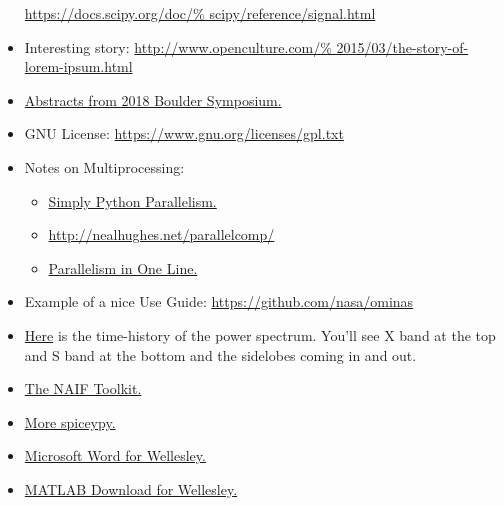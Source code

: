 \documentclass[crop=false,class=article,oneside]{standalone}
\begin{document}
\begin{itemize}[itemsep=0pt]
                      \url{https://docs.scipy.org/doc/%
                           scipy/reference/signal.html}
                \item Interesting story:
                      \url{http://www.openculture.com/%
                           2015/03/the-story-of-lorem-ipsum.html}
                \item \href{http://lasp.colorado.edu/media/%
                            projects/cassini/docs/%
                            Cassini_Science_Symposium_2018_%
                            Program-LowResForWeb.pdf}
                           {Abstracts from 2018 Boulder Symposium.}
                \item GNU License:
                      \url{https://www.gnu.org/licenses/gpl.txt}
                \item Notes on Multiprocessing:
                \begin{itemize}
                    \item \href{https://stsievert.com/blog/2014/07/30/%
                                simple-python-parallelism/}
                               {Simply Python Parallelism.}
                    \item \url{http://nealhughes.net/parallelcomp/}
                    \item \href{http://chriskiehl.com/article/%
                                parallelism-in-one-line/}
                               {Parallelism in One Line.}
                \end{itemize}
                \item Example of a nice Use Guide:
                      \url{https://github.com/nasa/ominas}
                \item \href{https://www.youtube.com/%
                            watch?time_continue=2&v=s-Xw6i61N9o}
                           {Here}
                      is the time-history of the power spectrum.
                      You'll see X band at the top and S band at
                      the bottom and the sidelobes coming in and out.
                \item \href{https://naif.jpl.nasa.gov/naif/toolkit.html}
                           {The NAIF Toolkit.}
                \item \href{http://spiceypy.readthedocs.io/en/%
                            master/exampleone.html}
                           {More spiceypy.}
                \item \href{http://www.wellesley.edu/lts/%
                            office365\#38MbQkK5QQom6URk.97}
                           {Microsoft Word for Wellesley.}
                \item \href{http://www.wellesley.edu/lts/%
                            techsupport/macs\#OyZifeYOQ4rso8ep.97}
                           {MATLAB Download for Wellesley.}
            \end{itemize}
\end{document}
